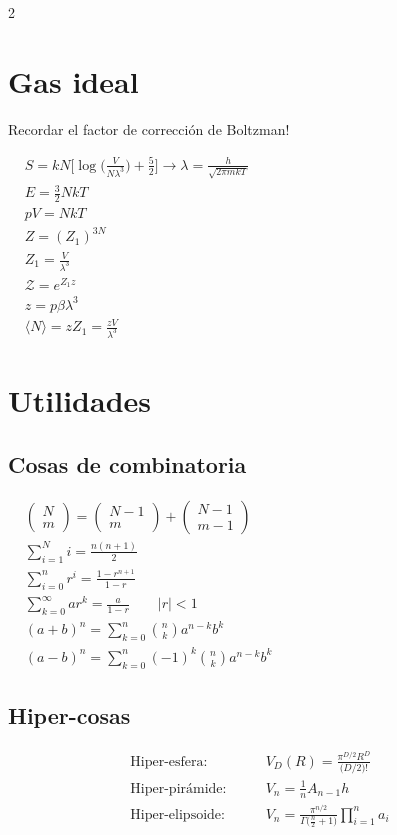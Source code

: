 \documentclass{article}
\begin{document}
\begin{multicols}{2}
\section*{Gas ideal}
Recordar el factor de corrección de Boltzman!

$
\begin{aligned}
    &S = kN \bigg[\log{\bigg(\frac{V}{N \lambda^3}\bigg)} + \frac{5}{2}\bigg] \rightarrow \lambda = \frac{h}{\sqrt{2\pi m kT}} \\
    &E = \frac{3}{2}NkT \\
    &pV = NkT \\
    &Z = (Z_1)^{3N} \\
    &Z_1 = \frac{V}{\lambda^3} \\
    &\mathcal{Z} = e^{Z_1 z} \\
    &z = p\beta \lambda^3 \\
    &\langle N \rangle = z Z_1 = \frac{zV}{\lambda^3}
\end{aligned}
$

\section*{Utilidades}
\subsection{Cosas de combinatoria}
$
\begin{aligned}
    &\begin{pmatrix} N \\ m \end{pmatrix} = \begin{pmatrix} N - 1 \\ m \end{pmatrix} + \begin{pmatrix} N - 1 \\ m - 1 \end{pmatrix} \\
    &\sum_{i=1}^{N}i = \frac{n(n + 1)}{2} \\
    &\sum_{i = 0}^{n}r^i = \frac{1- r^{n + 1}}{1 - r} \\
    &\sum_{k=0}^\infty a r^k = \frac{a}{1-r} \quad \quad |r|<1 \\
    &(a+b)^n= \sum_{k=0}^n \binom{n}{k} a^{n - k} b^{k} \\
    &(a-b)^n = \sum_{k=0}^n (-1)^k \binom{n}{k} a^{n - k} b^{k}
\end{aligned}
$

\subsection*{Hiper-cosas}

\begin{align*}
    \text{Hiper-esfera:}\qquad
    &V_D(R)=\frac{\pi^{D/2}R^D}{\big(D/2\big)!}
    \\[1em]
    \text{Hiper-pirámide:}\qquad
    &V_n=\frac{1}{n}A_{n-1}h
    \\[1em]
    \text{Hiper-elipsoide:}\qquad
    &V_n=\frac{\pi^{n/2}}
    {\Gamma\big(\frac{n}{2}+1\big)}
    \prod_{i=1}^{n} a_i
\end{align*}

\end{multicols}
\end{document}
